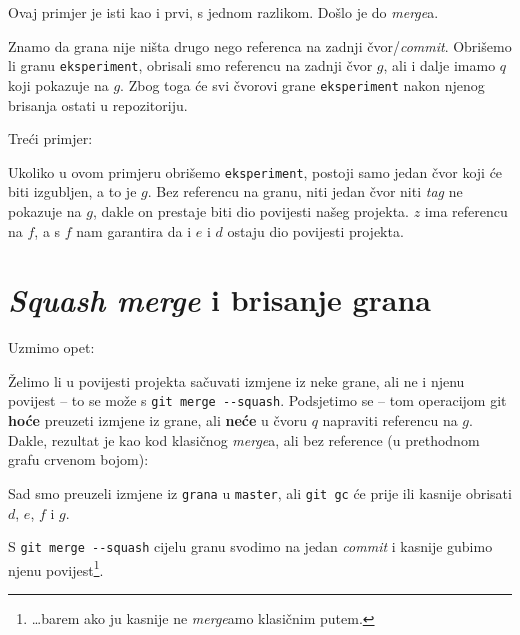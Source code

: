 Ovaj primjer je isti kao i prvi, s jednom razlikom. 
Došlo je do \emph{merge}a.

Znamo da grana nije ništa drugo nego referenca na zadnji čvor/\emph{commit}.
Obrišemo li granu \verb+eksperiment+, obrisali smo referencu na zadnji čvor $g$, ali i dalje imamo $q$ koji pokazuje na $g$.
Zbog toga će svi čvorovi grane \verb+eksperiment+ nakon njenog brisanja ostati u repozitoriju.

Treći primjer:



Ukoliko u ovom primjeru obrišemo \verb+eksperiment+, postoji samo jedan čvor koji će biti izgubljen, a to je $g$.
Bez referencu na granu, niti jedan čvor niti \emph{tag} ne pokazuje na $g$, dakle on prestaje biti dio povijesti našeg projekta.
$z$ ima referencu na $f$, a s $f$ nam garantira da i $e$ i $d$ ostaju dio povijesti projekta.

\section*{\emph{Squash merge} i brisanje grana}

Uzmimo opet:



Želimo li u povijesti projekta sačuvati izmjene iz neke grane, ali ne i njenu povijest -- to se može s \verb+git merge --squash+.
Podsjetimo se -- tom operacijom git \textbf{hoće} preuzeti izmjene iz grane, ali \textbf{neće} u čvoru $q$ napraviti referencu na $g$.
Dakle, rezultat je kao kod klasičnog \emph{merge}a, ali bez reference (u prethodnom grafu crvenom bojom):



Sad smo preuzeli izmjene iz \verb+grana+ u \verb+master+, ali \verb+git gc+ će prije ili kasnije obrisati $d$, $e$, $f$ i $g$.

S \verb+git merge --squash+ cijelu granu svodimo na jedan \emph{commit} i kasnije gubimo njenu povijest\footnote{\dots{}barem ako ju kasnije ne \emph{merge}amo klasičnim putem.}.
